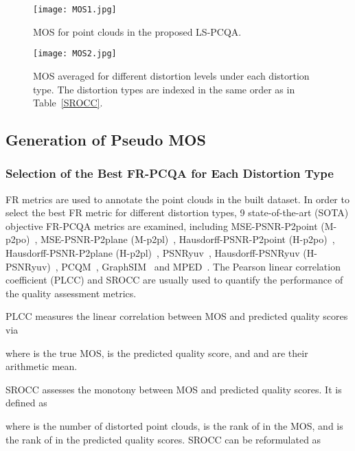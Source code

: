 \documentclass[acmsmall]{acmart}
\begin{document}
\begin{figure*}[htbp]
	\centering
	\texttt{[image: MOS1.jpg]}
	\caption{MOS for point clouds in the proposed LS-PCQA.}
	\label{MOS1}

	\centering
	\texttt{[image: MOS2.jpg]}
	\caption{MOS averaged for different distortion levels under each distortion type. The distortion types are indexed in the same order as in Table~\ref{SROCC}.}
	\label{MOS2}

\end{figure*}




\subsection{Generation of Pseudo MOS} \label{sec:remaininglabeling}

\subsubsection{Selection of the Best FR-PCQA for Each Distortion Type}

\par FR metrics are used to annotate the point clouds in the built dataset. In order to select the best FR metric for different distortion types, 9 state-of-the-art (SOTA) objective FR-PCQA metrics are examined, including MSE-PSNR-P2point (M-p2po)~\cite{cignoni1998metro,MPEGSoft}, MSE-PSNR-P2plane (M-p2pl)~\cite{Mekuria2016Evaluation,MPEGSoft}, Hausdorff-PSNR-P2point (H-p2po)~\cite{cignoni1998metro,MPEGSoft}, Hausdorff-PSNR-P2plane (H-p2pl)~\cite{Mekuria2016Evaluation,MPEGSoft}, PSNRyuv~\cite{MPEGSoft}, Hausdorff-PSNRyuv (H-PSNRyuv)~\cite{MPEGSoft}, PCQM~\cite{meynet2020pcmd}, GraphSIM~\cite{yang2020graphsim} and MPED~\cite{yang2021MPED}. The Pearson linear correlation coefficient (PLCC) and SROCC are usually used to quantify the performance of the quality assessment metrics.

\par PLCC measures the linear correlation between MOS and predicted quality scores via

where  is the true MOS,  is the predicted quality score, and  and  are their arithmetic mean.

\par SROCC assesses the monotony between MOS and predicted quality scores. It is defined as

where  is the number of distorted point clouds,  is the rank of  in the MOS, and  is the rank of  in the predicted quality scores. SROCC can be reformulated as
\end{document}
